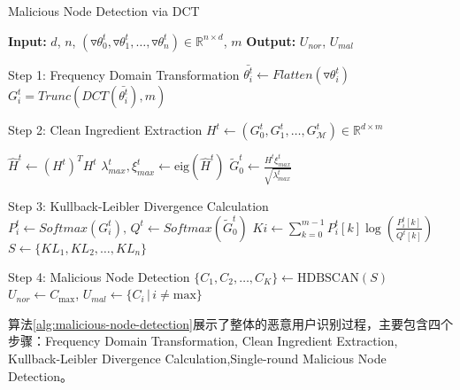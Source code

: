 \documentclass[lettersize,journal]{IEEEtran}
\begin{document}
\begin{algorithm}
\caption{Malicious Node Detection via DCT}
\label{alg:malicious-node-detection}
\begin{algorithmic}[1]
\State \textbf{Input:} $d$, $n$, $(\triangledown \theta_0^t, \triangledown \theta_1^t, \ldots, \triangledown \theta_n^t) \in \mathbb{R}^{n \times d}$, $m$ 
\State \textbf{Output:} $U_{nor}$, $U_{mal}$ 

\State Step 1: Frequency Domain Transformation
    \State $\bar{\theta_i^t} \gets Flatten(\triangledown \theta_i^t)$
    \State $G_i^t = Trunc(DCT(\bar{\theta_i^t}), m)$ 
\EndFor

\State

\State Step 2: Clean Ingredient Extraction
\State $H^t \gets (G_0^t, G_1^t, \ldots, G_{\mathcal{M}}^t) \in \mathbb{R}^{d \times m}$ 

\State $\hat{H}^t \gets (H^t)^{T} H^t$
\State $\lambda_{max}^t, \xi_{max}^t \gets \text{eig}(\hat{H}^t)$ 
\State $\tilde{G}^t_0 \gets \frac{H^t \xi_{max}^t}{\sqrt{\lambda_{max}^t}}$ 

\State

\State Step 3: Kullback-Leibler Divergence Calculation
\State $P_i^t \gets Softmax(G_i^t), \, Q^t \gets Softmax(\tilde{G}^t_0)$
    \State $Ki \gets \sum_{k=0}^{m-1} P_i^t[k] \log \left( \frac{P_i^t[k]}{Q^t[k]} \right)$
\EndFor
\State $S \gets \{KL_1, KL_2, \ldots, KL_n\}$ 

\State

\State Step 4: Malicious Node Detection
\State $\{C_1, C_2, \ldots, C_K\} \gets \text{HDBSCAN}(S)$
\State $U_{nor} \gets C_{\text{max}}$, $U_{mal} \gets \{C_i \, | \, i \neq \text{max}\}$

\end{algorithmic}
\end{algorithm}
算法\ref{alg:malicious-node-detection}展示了整体的恶意用户识别过程，主要包含四个步骤：Frequency Domain Transformation, Clean Ingredient Extraction, Kullback-Leibler Divergence Calculation,Single-round Malicious Node Detection。
\end{document}

